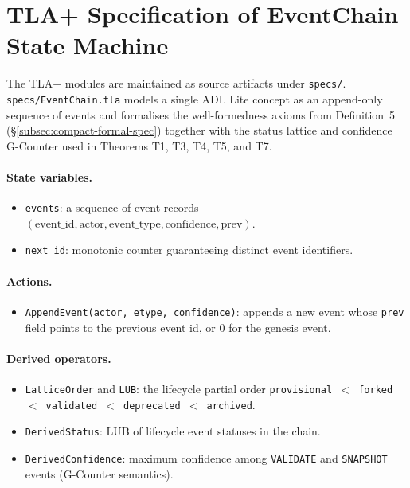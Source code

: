 \section{TLA+ Specification of EventChain State Machine}\label{app:tla}

The TLA+ modules are maintained as source artifacts under \texttt{specs/}.
\texttt{specs/EventChain.tla} models a single ADL Lite concept as an append-only
sequence of events and formalises the well-formedness axioms from Definition~5
(\S\ref{subsec:compact-formal-spec}) together with the status lattice and confidence
G-Counter used in Theorems T1, T3, T4, T5, and T7.

\paragraph{State variables.}
\begin{itemize}
  \item \texttt{events}: a sequence of event records
    $(\text{event\_id}, \text{actor}, \text{event\_type}, \text{confidence}, \text{prev})$.
  \item \texttt{next\_id}: monotonic counter guaranteeing distinct event identifiers.
\end{itemize}

\paragraph{Actions.}
\begin{itemize}
  \item \texttt{AppendEvent(actor, etype, confidence)}: appends a new event whose
    \texttt{prev} field points to the previous event id, or $0$ for the genesis event.
\end{itemize}

\paragraph{Derived operators.}
\begin{itemize}
  \item \texttt{LatticeOrder} and \texttt{LUB}: the lifecycle partial order
    \texttt{provisional $<$ forked $<$ validated $<$ deprecated $<$ archived}.
  \item \texttt{DerivedStatus}: LUB of lifecycle event statuses in the chain.
  \item \texttt{DerivedConfidence}: maximum confidence among \texttt{VALIDATE} and
    \texttt{SNAPSHOT} events (G-Counter semantics).
\end{itemize}

